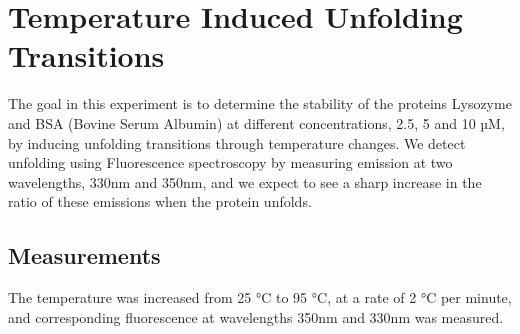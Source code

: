 \documentclass[a4paper,11pt]{article}
\begin{document}
    \section{Temperature Induced Unfolding Transitions}
        The goal in this experiment is to determine the stability of the proteins Lysozyme and BSA 
        (Bovine Serum Albumin) at different concentrations, 2.5, 5 and 10 µM, by inducing unfolding 
        transitions through temperature changes.
        We detect unfolding using Fluorescence spectroscopy by measuring emission at 
        two wavelengths, 330nm and 350nm, and we expect to see a sharp increase in the ratio
        of these emissions when the protein unfolds.

        \subsection*{Measurements}
            The temperature was increased from 25 °C to 95 °C, at a rate of 2 °C per minute,
            and corresponding fluorescence at wavelengths 350nm and 330nm was measured.
\end{document}
